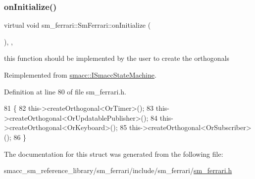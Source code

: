 \subsubsection{\texorpdfstring{on\+Initialize()}{onInitialize()}}
{\footnotesize\ttfamily virtual void sm\+\_\+ferrari\+::\+Sm\+Ferrari\+::on\+Initialize (\begin{DoxyParamCaption}{ }\end{DoxyParamCaption})\hspace{0.3cm}{\ttfamily [inline]}, {\ttfamily [override]}, {\ttfamily [virtual]}}



this function should be implemented by the user to create the orthogonals 



Reimplemented from \hyperlink{classsmacc_1_1ISmaccStateMachine_ac2982c6c8283663e5e1e8a7c82f511ec}{smacc\+::\+I\+Smacc\+State\+Machine}.



Definition at line 80 of file sm\+\_\+ferrari.\+h.


\begin{DoxyCode}
81     \{
82         this->createOrthogonal<OrTimer>();
83         this->createOrthogonal<OrUpdatablePublisher>();
84         this->createOrthogonal<OrKeyboard>();
85         this->createOrthogonal<OrSubscriber>();
86     \}
\end{DoxyCode}


The documentation for this struct was generated from the following file\+:\begin{DoxyCompactItemize}
\item 
smacc\+\_\+sm\+\_\+reference\+\_\+library/sm\+\_\+ferrari/include/sm\+\_\+ferrari/\hyperlink{sm__ferrari_8h}{sm\+\_\+ferrari.\+h}\end{DoxyCompactItemize}
